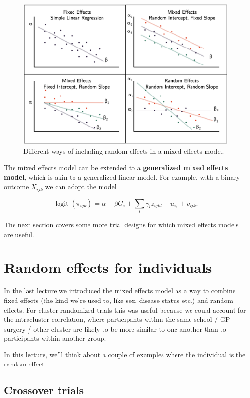 \documentclass[
  openany]{book}
\theoremstyle{definition}
\theoremstyle{definition}
\theoremstyle{definition}
\theoremstyle{definition}
\theoremstyle{remark}
\begin{document}
\begin{figure}
\includegraphics[width=29.97in]{images/raneffmodels} \caption{Different ways of including random effects in a mixed effects model.}\label{fig:raneffmodels}
\end{figure}

The mixed effects model can be extended to a \textbf{generalized mixed effects model}, which is akin to a generalized linear model. For example, with a binary outcome \(X_{ijk}\) we can adopt the model

\[
\operatorname{logit}\left(\pi_{ijk}\right) = \alpha + \beta G_i + \sum\limits_l \gamma_l z_{ijkl} + u_{ij} + v_{ijk}.
\]

The next section covers some more trial designs for which mixed effects models are useful.

\chapter{Random effects for individuals}\label{random-effects-for-individuals}

In the last lecture we introduced the mixed effects model as a way to combine fixed effects (the kind we're used to, like sex, disease status etc.) and random effects. For cluster randomized trials this was useful because we could account for the intracluster correlation, where participants within the same school / GP surgery / other cluster are likely to be more similar to one another than to participants within another group.

In this lecture, we'll think about a couple of examples where the individual is the random effect.

\section{Crossover trials}\label{crossover-trials}
\end{document}
